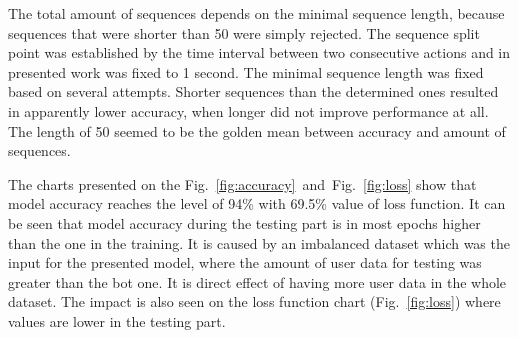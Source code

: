 The total amount of sequences depends on the minimal sequence length, because sequences that were shorter than \num{50} were simply rejected.
The sequence split point was established by the time interval between two consecutive actions and in presented work was fixed to \num{1} second.
The minimal sequence length was fixed based on several attempts.
Shorter sequences than the determined ones resulted in apparently lower accuracy, when longer did not improve performance at all.
The length of \num{50} seemed to be the golden mean between accuracy and amount of sequences.

The charts presented on the \mbox{Fig.~\ref{fig:accuracy} and Fig.~\ref{fig:loss}} show that model accuracy reaches the level of \num{94}\% with \num{69.5}\% value of loss function.
It can be seen that model accuracy during the testing part is in most epochs higher than the one in the training.
It is caused by an imbalanced dataset which was the input for the presented model, where
the amount of user data for testing was greater than the bot one.
It is direct effect of having more user data in the whole dataset.
The impact is also seen on the loss function chart \mbox{(Fig.~\ref{fig:loss})} where values are lower in the testing part.

